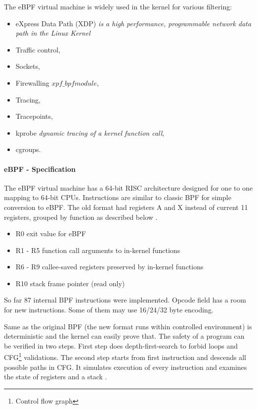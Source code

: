 The eBPF virtual machine is widely used in the kernel for various filtering:
\begin{itemize}
	\item eXpress Data Path (XDP) \textit{is a high performance, programmable network data path in the Linux Kernel}
    \item Traffic control,
    \item Sockets,
    \item Firewalling \textit{\(xpf\_bpf module\)},
    \item Tracing,
    \item Tracepoints,
    \item kprobe \textit{dynamic tracing of a kernel function call},
    \item cgroups.
\end{itemize}

\paragraph{eBPF - Specification}
The eBPF virtual machine has a 64-bit RISC architecture designed for one to one mapping to 64-bit CPUs.
Instructions are similar to classic BPF for simple conversion to eBPF.
The old format had registers A and X instead of current 11 registers, grouped by function as described below \cite{kernel_bpf_specification}.
\pagebreak
\begin{itemize}
	\item R0 exit value for eBPF
	\item R1 - R5 function call arguments to in-kernel functions
	\item R6 - R9 callee-saved registers preserved by in-kernel functions
	\item R10 stack frame pointer (read only)
\end{itemize}

So far 87 internal BPF instructions were implemented.
Opcode field has a room for new instructions.
Some of them may use 16/24/32 byte encoding.

Same as the original BPF (the new format runs within controlled environment) is deterministic and the kernel can easily prove that.
The safety of a program can be verified in two steps.
First step does depth-first-search to forbid  loops and CFG\footnote{Control flow graph} validations.
The second step starts from first instruction and descends all possible paths in CFG. It simulates execution of every instruction and examines the state of registers and a stack \cite{kernel_bpf_specification}.

